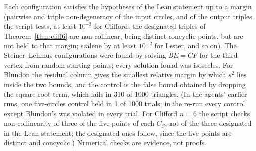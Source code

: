 \documentclass[11pt]{article}
\theoremstyle{definition}
\theoremstyle{remark}
\begin{document}
Each configuration satisfies the hypotheses of the Lean statement up to a margin (pairwise and triple
non-degeneracy of the input circles, and of the output triples the script tests, at least $10^{-3}$
for Clifford; the designated triples of Theorem~\ref{thm:cliff6} are non-collinear, being distinct concyclic
points, but are not held to that margin; scalene by at least $10^{-2}$ for Lester, and so on). The
Steiner--Lehmus configurations were found by solving $BE=CF$ for the third vertex from random starting
points; every solution found was isosceles. For Blundon the residual column gives the smallest relative
margin by which $s^2$ lies inside the two bounds, and the control is the false bound obtained by dropping
the square-root term, which fails in 310 of 1000 triangles. (In the agents' earlier runs, one five-circles control held in 1 of 1000 trials; in the re-run
every control except Blundon's was violated in every trial. For Clifford $n=6$ the script checks
non-collinearity of three of the five points of each $C_S$, not of the three designated in the Lean
statement; the designated ones follow, since the five points are distinct and concyclic.) Numerical
checks are evidence, not proofs.
\end{document}
